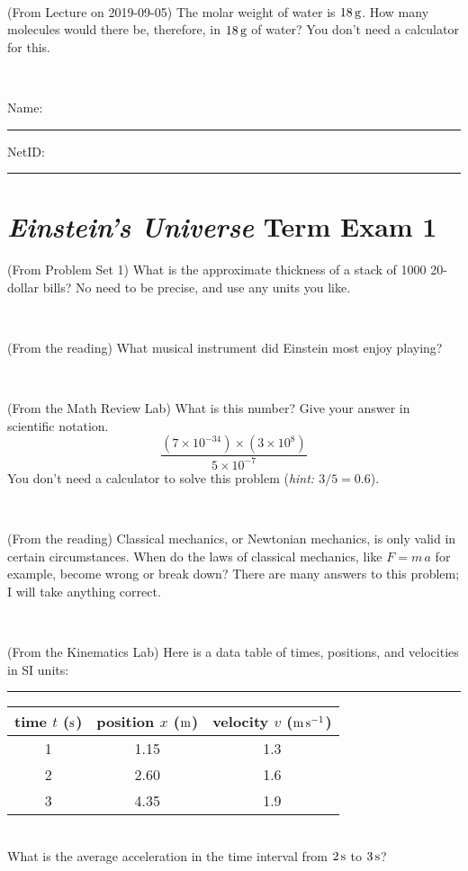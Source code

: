 \documentclass[12pt, letterpaper]{article}
\begin{document}
\vfill ~

\begin{problem} (From Lecture on 2019-09-05)
The molar weight of water is $18\,\mathrm{g}$. How many molecules would there
be, therefore, in $18\,\mathrm{g}$ of water? You don't need a calculator for
this.
\end{problem}


\vfill ~


\cleardoublepage



\noindent
Name: \rule[-1ex]{0.60\textwidth}{0.1pt}
NetID: \rule[-1ex]{0.20\textwidth}{0.1pt}

\section*{\textsl{Einstein's Universe} Term Exam 1}
\setcounter{problem}{1}


\begin{problem} (From Problem Set 1)
What is the approximate thickness of a stack of 1000 20-dollar bills?
No need to be precise, and use any units you like.
\end{problem}


\vfill ~

\begin{problem} (From the reading)
What musical instrument did Einstein most enjoy playing?
\end{problem}


\vfill ~

\begin{problem} (From the Math Review Lab)
What is this number? Give your answer in scientific notation.
$$
\frac{(7\times10^{-34})\times(3\times10^8)}{5\times10^{-7}}
$$
You don't need a calculator to solve this problem (\textit{hint: $3/5=0.6$}).
\end{problem}


\vfill ~

\begin{problem} (From the reading)
Classical mechanics, or Newtonian mechanics, is only valid in certain
circumstances. When do the laws of classical mechanics, like $F =
m\,a$ for example, become wrong or break down? There are many answers
to this problem; I will take anything correct.
\end{problem}


\vfill ~


\clearpage


\begin{problem} (From the Kinematics Lab)
Here is a data table of times, positions, and velocities in SI units:\\
\rule{1.0in}{0pt}\begin{tabular}{c|c|c}
time $t$ ($\mathrm{s}$) & position $x$ ($\mathrm{m}$) & velocity $v$ ($\mathrm{m}\,\mathrm{s}^{-1}$) \\
\hline
1 & 1.15 & 1.3 \\
2 & 2.60 & 1.6 \\
3 & 4.35 & 1.9 \\
\hline
\end{tabular}\\
What is the average acceleration in the time interval from $2\,\mathrm{s}$ to $3\,\mathrm{s}$?
\end{problem}
\end{document}
